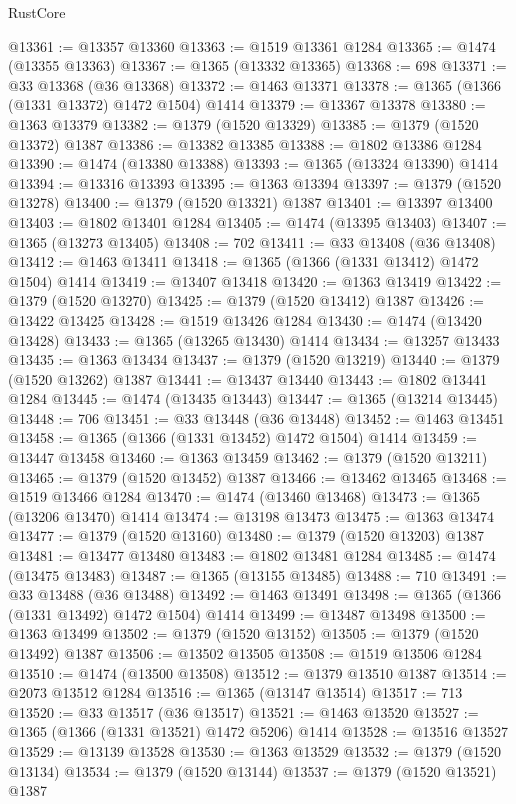 \begin{lexlean}{RustCore}
\begin{coremodule}
@13361 := @13357 @13360
@13363 := @1519 @13361 @1284
@13365 := @1474 (@13355 @13363)
@13367 := @1365 (@13332 @13365)
@13368 := 698
@13371 := @33 @13368 (@36 @13368)
@13372 := @1463 @13371
@13378 := @1365 (@1366 (@1331 @13372) @1472 @1504) @1414
@13379 := @13367 @13378
@13380 := @1363 @13379
@13382 := @1379 (@1520 @13329)
@13385 := @1379 (@1520 @13372) @1387
@13386 := @13382 @13385
@13388 := @1802 @13386 @1284
@13390 := @1474 (@13380 @13388)
@13393 := @1365 (@13324 @13390) @1414
@13394 := @13316 @13393
@13395 := @1363 @13394
@13397 := @1379 (@1520 @13278)
@13400 := @1379 (@1520 @13321) @1387
@13401 := @13397 @13400
@13403 := @1802 @13401 @1284
@13405 := @1474 (@13395 @13403)
@13407 := @1365 (@13273 @13405)
@13408 := 702
@13411 := @33 @13408 (@36 @13408)
@13412 := @1463 @13411
@13418 := @1365 (@1366 (@1331 @13412) @1472 @1504) @1414
@13419 := @13407 @13418
@13420 := @1363 @13419
@13422 := @1379 (@1520 @13270)
@13425 := @1379 (@1520 @13412) @1387
@13426 := @13422 @13425
@13428 := @1519 @13426 @1284
@13430 := @1474 (@13420 @13428)
@13433 := @1365 (@13265 @13430) @1414
@13434 := @13257 @13433
@13435 := @1363 @13434
@13437 := @1379 (@1520 @13219)
@13440 := @1379 (@1520 @13262) @1387
@13441 := @13437 @13440
@13443 := @1802 @13441 @1284
@13445 := @1474 (@13435 @13443)
@13447 := @1365 (@13214 @13445)
@13448 := 706
@13451 := @33 @13448 (@36 @13448)
@13452 := @1463 @13451
@13458 := @1365 (@1366 (@1331 @13452) @1472 @1504) @1414
@13459 := @13447 @13458
@13460 := @1363 @13459
@13462 := @1379 (@1520 @13211)
@13465 := @1379 (@1520 @13452) @1387
@13466 := @13462 @13465
@13468 := @1519 @13466 @1284
@13470 := @1474 (@13460 @13468)
@13473 := @1365 (@13206 @13470) @1414
@13474 := @13198 @13473
@13475 := @1363 @13474
@13477 := @1379 (@1520 @13160)
@13480 := @1379 (@1520 @13203) @1387
@13481 := @13477 @13480
@13483 := @1802 @13481 @1284
@13485 := @1474 (@13475 @13483)
@13487 := @1365 (@13155 @13485)
@13488 := 710
@13491 := @33 @13488 (@36 @13488)
@13492 := @1463 @13491
@13498 := @1365 (@1366 (@1331 @13492) @1472 @1504) @1414
@13499 := @13487 @13498
@13500 := @1363 @13499
@13502 := @1379 (@1520 @13152)
@13505 := @1379 (@1520 @13492) @1387
@13506 := @13502 @13505
@13508 := @1519 @13506 @1284
@13510 := @1474 (@13500 @13508)
@13512 := @1379 @13510 @1387
@13514 := @2073 @13512 @1284
@13516 := @1365 (@13147 @13514)
@13517 := 713
@13520 := @33 @13517 (@36 @13517)
@13521 := @1463 @13520
@13527 := @1365 (@1366 (@1331 @13521) @1472 @5206) @1414
@13528 := @13516 @13527
@13529 := @13139 @13528
@13530 := @1363 @13529
@13532 := @1379 (@1520 @13134)
@13534 := @1379 (@1520 @13144)
@13537 := @1379 (@1520 @13521) @1387

\end{coremodule}
\end{lexlean}
